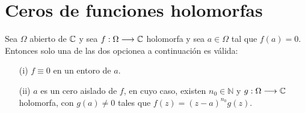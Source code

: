 \chapter{Ceros de funciones holomorfas}

\begin{teo}
    Sea $\Omega$ abierto de $\mathbb{C}$ y sea $f: \Omega \longrightarrow \mathbb{C}$ holomorfa y sea $a \in \Omega$ tal que $f(a) = 0$. Entonces solo una de las dos opcionea a continuación es válida:
    \begin{enumerate}
        \item[(i)] $f \equiv 0$ en un entoro de $a$.
        \item[(ii)] $a$ es un cero aislado de $f$, en cuyo caso, existen $n_0 \in \mathbb{N}$ y $g: \Omega \longrightarrow \mathbb{C}$ holomorfa, con $g(a) \not = 0$ tales que $f(z) = (z-a)^{n_0}g(z)$.
    \end{enumerate}
\end{teo}

